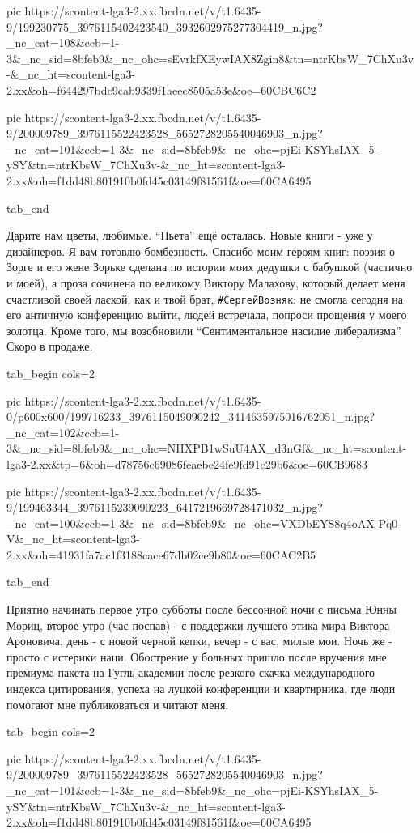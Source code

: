      pic https://scontent-lga3-2.xx.fbcdn.net/v/t1.6435-9/199230775_3976115402423540_3932602975277304419_n.jpg?_nc_cat=108&ccb=1-3&_nc_sid=8bfeb9&_nc_ohc=sEvrkfXEywIAX8Zgin8&tn=ntrKbsW_7ChXu3v-&_nc_ht=scontent-lga3-2.xx&oh=f644297bdc9cab9339f1aeec8505a53e&oe=60CBC6C2

     pic https://scontent-lga3-2.xx.fbcdn.net/v/t1.6435-9/200009789_3976115522423528_5652728205540046903_n.jpg?_nc_cat=101&ccb=1-3&_nc_sid=8bfeb9&_nc_ohc=pjEi-KSYhsIAX_5-ySY&tn=ntrKbsW_7ChXu3v-&_nc_ht=scontent-lga3-2.xx&oh=f1dd48b801910b0fd45c03149f81561f&oe=60CA6495

  tab_end
\fi


Дарите нам цветы, любимые. \enquote{Пьета} ещё осталась. Новые книги - уже у
дизайнеров. Я вам готовлю бомбезность. Спасибо моим героям книг: поэзия о Зорге
и его жене Зорьке сделана по истории моих  дедушки с бабушкой (частично и
моей), а проза сочинена по великому Виктору Малахову, который делает меня
счастливой своей лаской, как и твой брат, \verb|#СергейВозняк|: не смогла сегодня на
его античную конференцию выйти, людей встречала, попроси прощения у моего
золотца. Кроме того, мы возобновили \enquote{Сентиментальное насилие либерализма}.
Скоро в продаже.

\ifcmt
  tab_begin cols=2

     pic https://scontent-lga3-2.xx.fbcdn.net/v/t1.6435-0/p600x600/199716233_3976115049090242_3414635975016762051_n.jpg?_nc_cat=102&ccb=1-3&_nc_sid=8bfeb9&_nc_ohc=NHXPB1wSuU4AX_d3nGf&_nc_ht=scontent-lga3-2.xx&tp=6&oh=d78756c69086feaebe24fe9fd91c29b6&oe=60CB9683

     pic https://scontent-lga3-2.xx.fbcdn.net/v/t1.6435-9/199463344_3976115239090223_6417219669728471032_n.jpg?_nc_cat=100&ccb=1-3&_nc_sid=8bfeb9&_nc_ohc=VXDbEYS8q4oAX-Pq0-V&_nc_ht=scontent-lga3-2.xx&oh=41931fa7ac1f3188cace67db02ce9b80&oe=60CAC2B5

  tab_end
\fi


Приятно начинать первое утро субботы после бессонной ночи с письма Юнны Мориц,
второе утро (час поспав) - с поддержки лучшего этика мира Виктора Ароновича,
день - с новой черной кепки, вечер - с вас, милые мои. Ночь же  - просто с
истерики наци. Обострение у больных пришло после вручения мне премиума-пакета
на Гугль-академии после резкого скачка международного индекса цитирования,
успеха на луцкой конференции и квартирника, где люди помогают мне публиковаться
и читают меня.


\ifcmt
  tab_begin cols=2

     pic https://scontent-lga3-2.xx.fbcdn.net/v/t1.6435-9/200009789_3976115522423528_5652728205540046903_n.jpg?_nc_cat=101&ccb=1-3&_nc_sid=8bfeb9&_nc_ohc=pjEi-KSYhsIAX_5-ySY&tn=ntrKbsW_7ChXu3v-&_nc_ht=scontent-lga3-2.xx&oh=f1dd48b801910b0fd45c03149f81561f&oe=60CA6495

